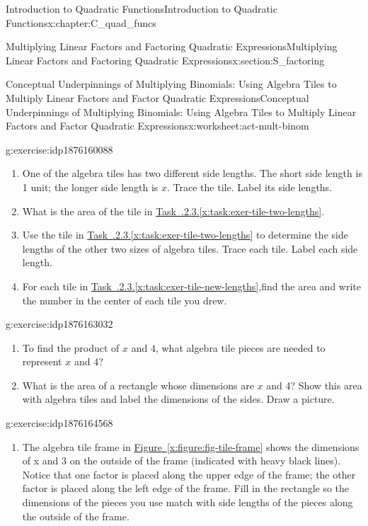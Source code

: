 \documentclass[oneside,10pt,]{book}
\newcommand{\xreffont}{\relax}
\numberwithin{equation}{chapter}
\begin{document}
\begin{chapterptx}{Introduction to Quadratic Functions}{}{Introduction to Quadratic Functions}{}{}{x:chapter:C_quad_funcs}
\begin{sectionptx}{Multiplying Linear Factors and Factoring Quadratic Expressions}{}{Multiplying Linear Factors and Factoring Quadratic Expressions}{}{}{x:section:S_factoring}
\begin{worksheet-subsection}{Conceptual Underpinnings of Multiplying Binomials: Using Algebra Tiles to Multiply Linear Factors and Factor Quadratic Expressions}{}{Conceptual Underpinnings of Multiplying Binomials: Using Algebra Tiles to Multiply Linear Factors and Factor Quadratic Expressions}{}{}{x:worksheet:act-mult-binom}
\begin{divisionexercise}{3}{}{}{g:exercise:idp1876160088}
\begin{enumerate}[font=\bfseries,label=(\alph*),ref=\alph*]
\item\label{x:task:exer-tile-two-lengths}One of the algebra tiles has two different side lengths. The short side length is 1 unit; the longer side length is \(x\). Trace the tile. Label its side lengths.%
\item{}What is the area of the tile in \hyperref[x:task:exer-tile-two-lengths]{Task~{\xreffont 4.3.2.3}.{\xreffont\ref{x:task:exer-tile-two-lengths}}}.%
\item\label{x:task:exer-tile-new-lengths}Use the tile in \hyperref[x:task:exer-tile-two-lengths]{Task~{\xreffont 4.3.2.3}.{\xreffont\ref{x:task:exer-tile-two-lengths}}} to determine the side lengths of the other two sizes of algebra tiles. Trace each tile. Label each side length.%
\item{}For each tile in \hyperref[x:task:exer-tile-new-lengths]{Task~{\xreffont 4.3.2.3}.{\xreffont\ref{x:task:exer-tile-new-lengths}}},find the area and write the number in the center of each tile you drew.%
\end{enumerate}
\end{divisionexercise}%
\begin{divisionexercise}{4}{}{}{g:exercise:idp1876163032}%
\begin{enumerate}[font=\bfseries,label=(\alph*),ref=\alph*]
\item{}To find the product of \(x\) and 4, what algebra tile pieces are needed to represent \(x\) and 4?%
\item{}What is the area of a rectangle whose dimensions are \(x\) and 4? Show this area with algebra tiles and label the dimensions of the sides. Draw a picture.%
\end{enumerate}
\end{divisionexercise}%
\begin{divisionexercise}{5}{}{}{g:exercise:idp1876164568}%
\begin{enumerate}[font=\bfseries,label=(\alph*),ref=\alph*]
\item\label{x:task:exer-tile-frame}The algebra tile frame in \hyperref[x:figure:fig-tile-frame]{Figure~{\xreffont\ref{x:figure:fig-tile-frame}}} shows the dimensions of x and 3 on the outside of the frame (indicated with heavy black lines). Notice that one factor is placed along the upper edge of the frame; the other factor is placed along the left edge of the frame. Fill in the rectangle so the dimensions of the pieces you use match with side lengths of the pieces along the outside of the frame.%

\end{enumerate}
\end{divisionexercise}
\end{worksheet-subsection}
\end{sectionptx}
\end{chapterptx}
\end{document}

